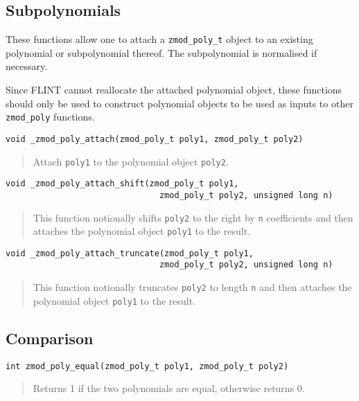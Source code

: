 \documentclass[a4paper,10pt]{article}
\newcommand{\code}{\lstinline}
\begin{document}
\subsection{Subpolynomials}
These functions allow one to attach a \code{zmod_poly_t} object to an existing polynomial or subpolynomial thereof. The subpolynomial is normalised if necessary.

Since FLINT cannot reallocate the attached polynomial object, these functions should only be used to construct polynomial objects to be used as inputs to other \code{zmod_poly} functions.

\begin{lstlisting}
void _zmod_poly_attach(zmod_poly_t poly1, zmod_poly_t poly2)
\end{lstlisting}
\begin{quote}
Attach \code{poly1} to the polynomial object \code{poly2}.
\end{quote}

\begin{lstlisting}
void _zmod_poly_attach_shift(zmod_poly_t poly1, 
                               zmod_poly_t poly2, unsigned long n)
\end{lstlisting}
\begin{quote}
This function notionally shifts \code{poly2} to the right by \code{n} coefficients and then attaches the polynomial object \code{poly1} to the result.
\end{quote}

\begin{lstlisting}
void _zmod_poly_attach_truncate(zmod_poly_t poly1, 
                               zmod_poly_t poly2, unsigned long n)
\end{lstlisting}
\begin{quote}
This function notionally truncates \code{poly2} to length \code{n} and then attaches the polynomial object \code{poly1} to the result.
\end{quote}

\subsection{Comparison}
\begin{lstlisting}
int zmod_poly_equal(zmod_poly_t poly1, zmod_poly_t poly2)
\end{lstlisting}
\begin{quote}
Returns 1 if the two polynomials are equal, otherwise returns 0.
\end{quote}
\end{document}
